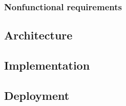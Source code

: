 \subsubsection{Nonfunctional requirements}
\label{subsubsec:nonfunctional-requirements}
\subsection{Architecture}
\label{subsec:architecture}
\subsection{Implementation}
\label{subsec:implementation}
\subsection{Deployment}
\label{subsec:deployment}

